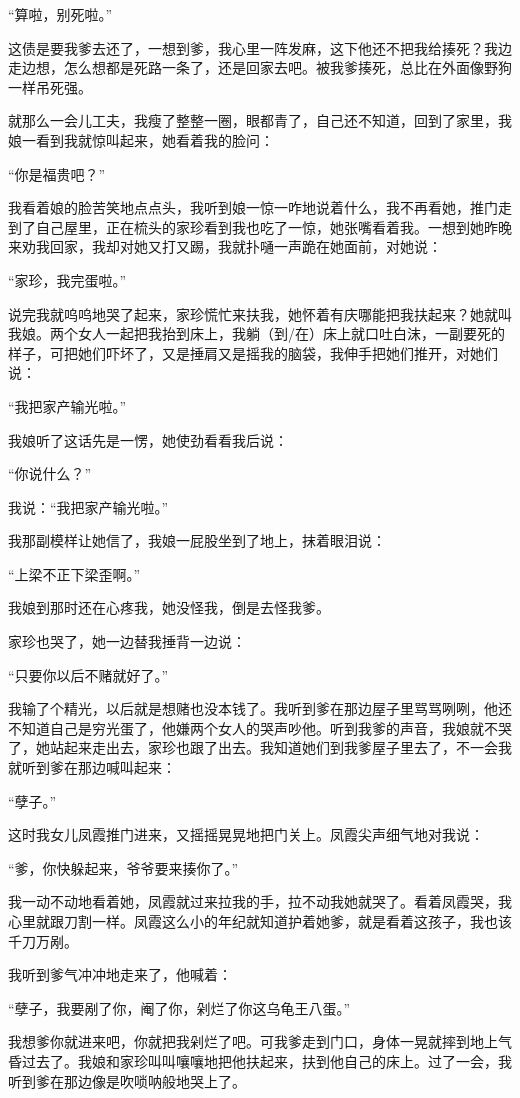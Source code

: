 \documentclass[12pt,UTF8]{ctexbook}
\begin{document}
“算啦，别死啦。”

这债是要我爹去还了，一想到爹，我心里一阵发麻，这下他还不把我给揍死？我边走边想，怎么想都是死路一条了，还是回家去吧。被我爹揍死，总比在外面像野狗一样吊死强。

就那么一会儿工夫，我瘦了整整一圈，眼都青了，自己还不知道，回到了家里，我娘一看到我就惊叫起来，她看着我的脸问：

“你是福贵吧？”

我看着娘的脸苦笑地点点头，我听到娘一惊一咋地说着什么，我不再看她，推门走到了自己屋里，正在梳头的家珍看到我也吃了一惊，她张嘴看着我。一想到她昨晚来劝我回家，我却对她又打又踢，我就扑嗵一声跪在她面前，对她说：

“家珍，我完蛋啦。”

说完我就呜呜地哭了起来，家珍慌忙来扶我，她怀着有庆哪能把我扶起来？她就叫我娘。两个女人一起把我抬到床上，我躺（到/在）床上就口吐白沫，一副要死的样子，可把她们吓坏了，又是捶肩又是摇我的脑袋，我伸手把她们推开，对她们说：

“我把家产输光啦。”

我娘听了这话先是一愣，她使劲看看我后说：

“你说什么？”

我说：“我把家产输光啦。”

我那副模样让她信了，我娘一屁股坐到了地上，抹着眼泪说：

“上梁不正下梁歪啊。”

我娘到那时还在心疼我，她没怪我，倒是去怪我爹。

家珍也哭了，她一边替我捶背一边说：

“只要你以后不赌就好了。”

我输了个精光，以后就是想赌也没本钱了。我听到爹在那边屋子里骂骂咧咧，他还不知道自己是穷光蛋了，他嫌两个女人的哭声吵他。听到我爹的声音，我娘就不哭了，她站起来走出去，家珍也跟了出去。我知道她们到我爹屋子里去了，不一会我就听到爹在那边喊叫起来：

“孽子。”

这时我女儿凤霞推门进来，又摇摇晃晃地把门关上。凤霞尖声细气地对我说：

“爹，你快躲起来，爷爷要来揍你了。”

我一动不动地看着她，凤霞就过来拉我的手，拉不动我她就哭了。看着凤霞哭，我心里就跟刀割一样。凤霞这么小的年纪就知道护着她爹，就是看着这孩子，我也该千刀万剐。

我听到爹气冲冲地走来了，他喊着：

“孽子，我要剐了你，阉了你，剁烂了你这乌龟王八蛋。”

我想爹你就进来吧，你就把我剁烂了吧。可我爹走到门口，身体一晃就摔到地上气昏过去了。我娘和家珍叫叫嚷嚷地把他扶起来，扶到他自己的床上。过了一会，我听到爹在那边像是吹唢呐般地哭上了。
\end{document}
